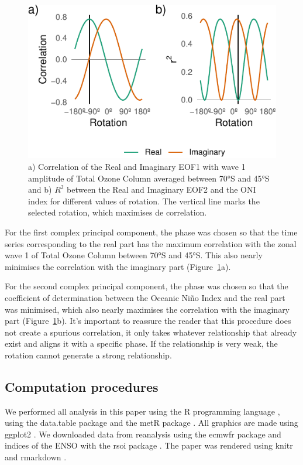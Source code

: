 \documentclass[smallextended]{svjour3}       %
\begin{document}
\begin{figure}
\centering
\includegraphics{../figures/rotations-1.pdf}
\caption{\label{fig:rotations}a) Correlation of the Real and Imaginary EOF1 with wave 1 amplitude of Total Ozone Column averaged between 70°S and 45°S and b) \(R^2\) between the Real and Imaginary EOF2 and the ONI index for different values of rotation. The vertical line marks the selected rotation, which maximises de correlation.}
\end{figure}

For the first complex principal component, the phase was chosen so that the time series corresponding to the real part has the maximum correlation with the zonal wave 1 of Total Ozone Column between 70°S and 45°S. This also nearly minimises the correlation with the imaginary part (Figure~\ref{fig:rotations}a).

For the second complex principal component, the phase was chosen so that the coefficient of determination between the Oceanic Niño Index \citep{bamston1997} and the real part was minimised, which also nearly maximises the correlation with the imaginary part (Figure~\ref{fig:rotations}b). It's important to reassure the reader that this procedure does not create a spurious correlation, it only takes whatever relationship that already exist and aligns it with a specific phase. If the relationship is very weak, the rotation cannot generate a strong relationship.

\hypertarget{computation-procedures}{%
\subsection{Computation procedures}\label{computation-procedures}}

We performed all analysis in this paper using the R programming language \citep{rcoreteam2020}, using the data.table package \citep{dowle2020} and the metR package \citep{campitelli2020}. All graphics are made using ggplot2 \citep{wickham2009}. We downloaded data from reanalysis using the ecmwfr package \citep{hufkens2020} and indices of the ENSO with the rsoi package \citep{albers2020}. The paper was rendered using knitr and rmarkdown \citep{xie2015, allaire2019}.
\end{document}
